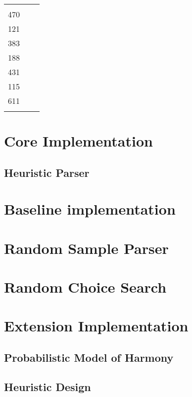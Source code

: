 \documentclass[12pt,a4paper,twoside,openright]{report}
\begin{document}
\begin{table}[h]
\begin{tabularx}{\textwidth}{l X c}
\begin{minipage}[t]{8cm}
  \end{minipage} & 
  \begin{minipage}[t]{0.5cm}
    2272
    \vspace{0.1\DTbaselineskip}\\
    470\\
    \vspace{\DTbaselineskip}
    121\\
    \vspace{\DTbaselineskip}
    383\\
    \vspace{1.8\DTbaselineskip}
    188\\
    \vspace{3.7\DTbaselineskip}
    431\\
    \vspace{3\DTbaselineskip}
    115\\
    \vspace{2.5\DTbaselineskip}
    611\\
  \end{minipage}
\end{tabularx}
\end{table}

\section{Core Implementation}
\subsection{Heuristic Parser}
\section{Baseline implementation}
\section{Random Sample Parser}
\section{Random Choice Search}
\section{Extension Implementation}
\subsection{Probabilistic Model of Harmony}
\subsection{Heuristic Design}
\end{document}
